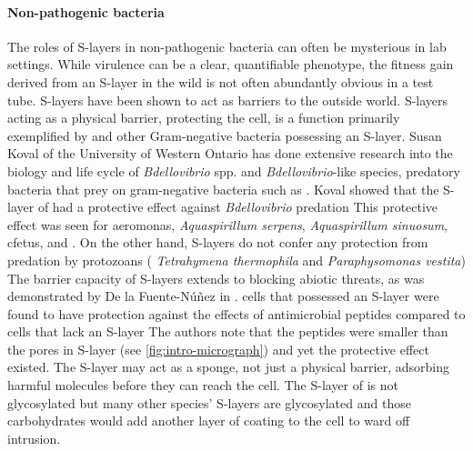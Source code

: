 \paragraph{Non-pathogenic bacteria} \label{sec:non-path-bact} %
The roles of \acp{S-layer} in non-pathogenic bacteria can often be mysterious in lab settings. While virulence can be a clear, quantifiable phenotype, the fitness gain derived from an \ac{S-layer} in the wild is not often abundantly obvious in a test tube. \acp{S-layer} have been shown to act as barriers to the outside world.
\acp{S-layer} acting as a physical barrier, protecting the cell, is a function primarily exemplified by \caulobacter and other Gram-negative bacteria possessing an \ac{S-layer}. Susan Koval of the University of Western Ontario has done extensive research into the biology and life cycle of \textit{Bdellovibrio} spp. and \textit{Bdellovibrio}-like species, predatory bacteria that prey on gram-negative bacteria such as \caulobacter. Koval showed that the \ac{S-layer} of \caulobacter had a protective effect against \textit{Bdellovibrio} predation This protective effect was seen for  \ac{aeromonas}, \textit{Aquaspirillum serpens}, \textit{Aquaspirillum sinuosum}, \ac{cfetus}, and \caulobacter. On the other hand, \acp{S-layer} do not confer any protection from predation by protozoans (\eg{} \textit{Tetrahymena thermophila} and \textit{Paraphysomonas vestita}) The barrier capacity of \acp{S-layer} extends to blocking abiotic threats, as was demonstrated by De la Fuente-N{\'u}{\~n}ez \etal in . \caulobacter cells that possessed an \ac{S-layer} were found to have protection against the effects of antimicrobial peptides compared to cells that lack an \ac{S-layer} The authors note that the peptides were smaller than the pores in \caulobacter \ac{S-layer} (see \cref{fig:intro-micrograph}) and yet the protective effect existed. The \ac{S-layer} may act as a sponge, not just a physical barrier, adsorbing harmful molecules before they can reach the cell. The \ac{S-layer} of \caulobacter{} is not glycosylated but many other species' \acp{S-layer} are glycosylated and those carbohydrates would add another layer of coating to the cell to ward off intrusion.


